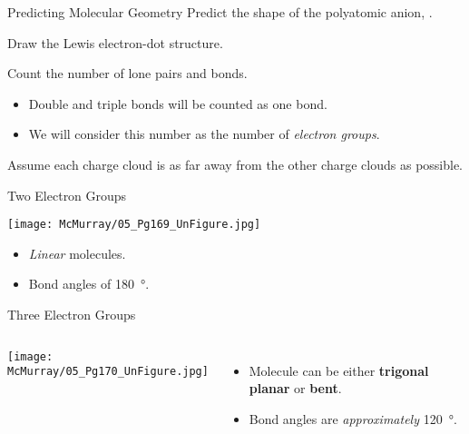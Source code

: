 \documentclass[notes=hide]{beamer}
\begin{document}
\begin{frame}{Predicting Molecular Geometry}
	Predict the shape of the polyatomic anion, .

	\bigskip

	\begin{description}[<+(1)->]
		\item[Step 1:] Draw the Lewis electron-dot structure.
		\item[Step 2:] Count the number of lone pairs and bonds.
			\begin{itemize}[<1->]
				\item Double and triple bonds will be counted as
					one bond.
				\item We will consider this number as the number
					of \emph{electron groups}.
			\end{itemize} 
		\item[Step 3:] Assume each charge cloud is as far away from the
			other charge clouds as possible.
	\end{description}
\end{frame}

\begin{frame}{Two Electron Groups}
	\begin{center}
		\texttt{[image: McMurray/05\_Pg169\_UnFigure.jpg]}
	\end{center}

	\bigskip
	
	\begin{itemize}
		\item \emph{Linear} molecules.
		\item Bond angles of \SI{180}{\degree}.
	\end{itemize}
\end{frame}

\begin{frame}{Three Electron Groups}
	\begin{columns}
		\begin{center}
			\texttt{[image: McMurray/05\_Pg170\_UnFigure.jpg]}
		\end{center}
		\begin{itemize}
			\item Molecule can be either \textbf{trigonal planar} or
				\textbf{bent}.
			\item Bond angles are \emph{approximately}
				\SI{120}{\degree}.
		\end{itemize}
	\end{columns}
\end{frame}
\end{document}
